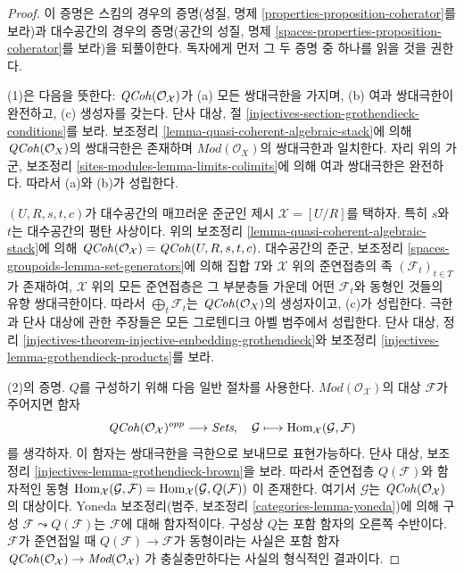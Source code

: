 \begin{proof}
이 증명은 스킴의 경우의 증명(성질, 명제
\ref{properties-proposition-coherator}를 보라)과 대수공간의
경우의 증명(공간의 성질, 명제
\ref{spaces-properties-proposition-coherator}를 보라)을 되풀이한다.
독자에게 먼저 그 두 증명 중 하나를 읽을 것을 권한다.

\medskip\noindent
(1)은 다음을 뜻한다: $\mathit{QCoh}(\mathcal{O}_\mathcal{X})$가
(a) 모든 쌍대극한을 가지며, (b) 여과 쌍대극한이 완전하고,
(c) 생성자를 갖는다. 단사 대상, 절
\ref{injectives-section-grothendieck-conditions}를 보라.
보조정리 \ref{lemma-quasi-coherent-algebraic-stack}에 의해
$\mathit{QCoh}(\mathcal{O}_X)$의 쌍대극한은 존재하며
$\textit{Mod}(\mathcal{O}_X)$의 쌍대극한과 일치한다.
자리 위의 가군, 보조정리
\ref{sites-modules-lemma-limits-colimits}에 의해
여과 쌍대극한은 완전하다. 따라서 (a)와 (b)가 성립한다.

\medskip\noindent
$(U, R, s, t, c)$가 대수공간의 매끄러운 준군인 제시
$\mathcal{X} = [U/R]$를 택하자. 특히 $s$와 $t$는 대수공간의
평탄 사상이다. 위의 보조정리
\ref{lemma-quasi-coherent-algebraic-stack}에 의해
$\mathit{QCoh}(\mathcal{O}_\mathcal{X}) = \mathit{QCoh}(U, R, s, t, c)$.
대수공간의 준군, 보조정리
\ref{spaces-groupoids-lemma-set-generators}에 의해 집합 $T$와
$\mathcal{X}$ 위의 준연접층의 족 $(\mathcal{F}_t)_{t \in T}$가
존재하여, $\mathcal{X}$ 위의 모든 준연접층은 그 부분층들 가운데
어떤 $\mathcal{F}_t$와 동형인 것들의 유향 쌍대극한이다.
따라서 $\bigoplus_t \mathcal{F}_t$는
$\mathit{QCoh}(\mathcal{O}_X)$의 생성자이고, (c)가 성립한다.
극한과 단사 대상에 관한 주장들은 모든 그로텐디크 아벨 범주에서 성립한다.
단사 대상, 정리
\ref{injectives-theorem-injective-embedding-grothendieck}와 보조정리
\ref{injectives-lemma-grothendieck-products}를 보라.

\medskip\noindent
(2)의 증명. $Q$를 구성하기 위해 다음 일반 절차를 사용한다.
$\textit{Mod}(\mathcal{O}_\mathcal{X})$의 대상 $\mathcal{F}$가
주어지면 함자
$$
\mathit{QCoh}(\mathcal{O}_\mathcal{X})^{opp}
\longrightarrow
\textit{Sets},
\quad
\mathcal{G}
\longmapsto
\mathop{\mathrm{Hom}}\nolimits_\mathcal{X}(\mathcal{G}, \mathcal{F})
$$
를 생각하자. 이 함자는 쌍대극한을 극한으로 보내므로 표현가능하다.
단사 대상, 보조정리
\ref{injectives-lemma-grothendieck-brown}을 보라.
따라서 준연접층 $Q(\mathcal{F})$와 함자적인 동형
$\mathop{\mathrm{Hom}}\nolimits_\mathcal{X}(\mathcal{G}, \mathcal{F}) =
\mathop{\mathrm{Hom}}\nolimits_\mathcal{X}(\mathcal{G}, Q(\mathcal{F}))$
이 존재한다. 여기서 $\mathcal{G}$는
$\mathit{QCoh}(\mathcal{O}_\mathcal{X})$의 대상이다.
Yoneda 보조정리(범주, 보조정리
\ref{categories-lemma-yoneda})에 의해 구성
$\mathcal{F} \leadsto Q(\mathcal{F})$는 $\mathcal{F}$에 대해
함자적이다. 구성상 $Q$는 포함 함자의 오른쪽 수반이다.
$\mathcal{F}$가 준연접일 때
$Q(\mathcal{F}) \to \mathcal{F}$가 동형이라는 사실은 포함 함자
$\mathit{QCoh}(\mathcal{O}_\mathcal{X}) \to
\textit{Mod}(\mathcal{O}_\mathcal{X})$
가 충실충만하다는 사실의 형식적인 결과이다.
\end{proof}








